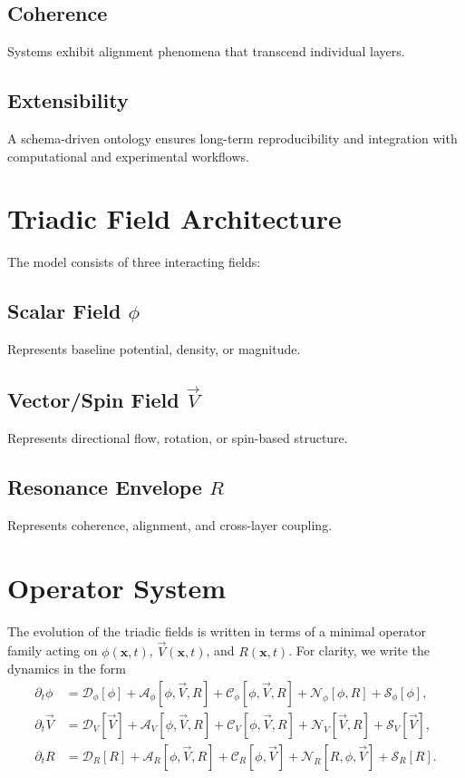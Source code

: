 \documentclass[12pt]{article}
\begin{document}
\subsection{Coherence}
Systems exhibit alignment phenomena that transcend individual layers.

\subsection{Extensibility}
A schema-driven ontology ensures long-term reproducibility and integration with computational and experimental workflows.

\section{Triadic Field Architecture}

The model consists of three interacting fields:

\subsection{Scalar Field $\phi$}
Represents baseline potential, density, or magnitude.

\subsection{Vector/Spin Field $\vec{V}$}
Represents directional flow, rotation, or spin-based structure.

\subsection{Resonance Envelope $R$}
Represents coherence, alignment, and cross-layer coupling.

\section{Operator System}

The evolution of the triadic fields is written in terms of a minimal operator family acting on
\(\phi(\mathbf{x}, t)\), \(\vec{V}(\mathbf{x}, t)\), and \(R(\mathbf{x}, t)\). For clarity, we write the dynamics in the form
\begin{align}
    \partial_t \phi &= \mathcal{D}_\phi[\phi] + \mathcal{A}_\phi[\phi, \vec{V}, R] + \mathcal{C}_\phi[\phi, \vec{V}, R] + \mathcal{N}_\phi[\phi, R] + \mathcal{S}_\phi[\phi], \\
    \partial_t \vec{V} &= \mathcal{D}_V[\vec{V}] + \mathcal{A}_V[\phi, \vec{V}, R] + \mathcal{C}_V[\phi, \vec{V}, R] + \mathcal{N}_V[\vec{V}, R] + \mathcal{S}_V[\vec{V}], \\
    \partial_t R &= \mathcal{D}_R[R] + \mathcal{A}_R[\phi, \vec{V}, R] + \mathcal{C}_R[\phi, \vec{V}] + \mathcal{N}_R[R, \phi, \vec{V}] + \mathcal{S}_R[R].
\end{align}
\end{document}

